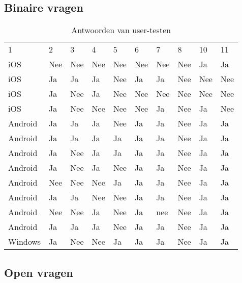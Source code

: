\subsection{Binaire vragen}
	\begin{table}[H]
		\centering
		\begin{tabular}{llllllllll}
			1 &  2 & 3 & 4 & 5 & 6 & 7 & 8 & 10 &11\\
			iOS & Nee & Nee & Nee & Nee & Nee & Nee & Nee & Ja & Ja \\
			iOS & Ja & Ja & Ja & Nee & Ja & Ja & Nee & Nee & Nee \\
			iOS & Ja & Nee & Ja & Nee & Nee & Nee & Nee & Nee & Nee \\
			iOS & Ja & Nee & Nee & Nee & Nee & Ja & Nee & Ja & Nee \\
			Android & Ja & Ja & Ja & Nee & Ja & Ja & Nee & Ja & Ja \\
			Android & Ja & Ja & Ja & Ja & Ja & Ja & Nee & Ja & Ja \\
			Android & Ja & Nee & Ja & Ja & Ja & Ja & Nee & Ja & Ja \\
			Android & Ja & Nee & Ja & Nee & Ja & Ja & Nee & Ja & Ja \\
			Android & Nee & Nee & Nee & Ja & Ja & Ja & Nee & Ja & Ja \\
			Android & Ja & Ja & Nee & Nee & Ja & Ja & Nee & Ja & Ja \\
			Android & Nee & Nee & Ja & Nee & Ja & nee & Nee & Ja & Ja \\
			Android & Ja & Ja & Ja & Nee & Ja & Ja & Nee & Ja & Ja \\
			Windows & Ja & Nee & Nee & Ja & Ja & Ja & Nee & Ja & Ja \\
		\end{tabular}	
		\caption{Antwoorden van user-testen}
	\end{table}
	
\subsection{Open vragen}
